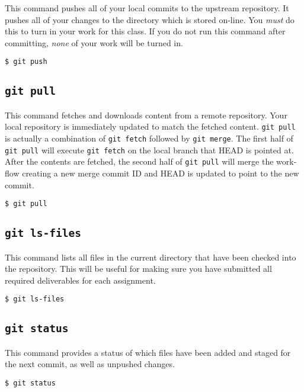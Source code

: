 \documentclass[11pt]{article}
\begin{document}
This command pushes all of your local commits to the upstream repository. It
pushes all of your changes to the directory which is stored on-line. You
\emph{must} do this to turn in your work for this class. If you do not run this
command after committing, \emph{none} of your work will be turned in.

\begin{lstlisting}[style=bashstyle]
  $ git push
\end{lstlisting}

\subsection{\texttt{git pull}}

This command fetches and downloads content from a remote repository. Your local
repository is immediately updated to match the fetched content. \texttt{git
pull} is actually a combination of \texttt{git fetch} followed by \texttt{git
merge}. The first half of \texttt{git pull} will execute \texttt{git fetch} on
the local branch that HEAD is pointed at. After the contents are fetched, the
second half of \texttt{git pull} will merge the work-flow creating a new merge
commit ID and HEAD is updated to point to the new commit.

\begin{lstlisting}[style=bashstyle]
  $ git pull
\end{lstlisting}

\subsection{\texttt{git ls-files}}

This command lists all files in the current directory that have been checked
into the repository. This will be useful for making sure you have submitted all
required deliverables for each assignment.

\begin{lstlisting}[style=bashstyle]
  $ git ls-files
\end{lstlisting}

\subsection{\texttt{git status}}

This command provides a status of which files have been added and staged for the
next commit, as well as unpushed changes.

\begin{lstlisting}[style=bashstyle]
  $ git status
\end{lstlisting}
\end{document}
